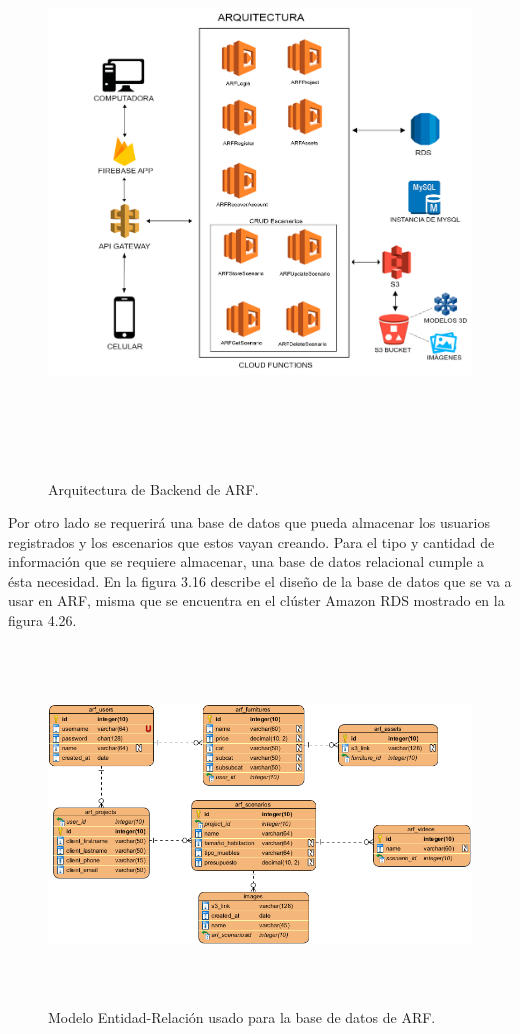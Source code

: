\begin{figure}[H]
	\centering
	\includegraphics[width=15cm,height=15cm]{imagenes/desarrollo/arquitectura/ArchitecturaBackend.png}
	\caption{Arquitectura de Backend de ARF.}
	\label{fig:arqbackend}
\end{figure}
\par
Por otro lado se requerirá una base de datos que pueda almacenar los usuarios registrados y los escenarios que estos vayan creando. Para el tipo y cantidad de información que se requiere almacenar, una base de datos relacional cumple a ésta necesidad. En la figura  3.16 describe el diseño de la base de datos que se va a usar en ARF, misma que se encuentra en el clúster Amazon RDS mostrado en la figura 4.26.
\begin{figure}[H]
	\centering
	\includegraphics[width=16cm,height=9.5cm]{imagenes/desarrollo/arquitectura/ERD.png}
	\caption{Modelo Entidad-Relación usado para la base de datos de ARF.}
	\label{fig:erd}
\end{figure}